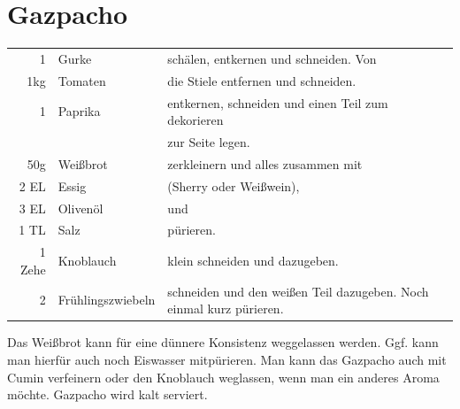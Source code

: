 \section{Gazpacho}
\begin{longtable}{rlL{16.46cm}}
    1       &   Gurke               &   schälen, entkernen und schneiden.
                                        Von\\
    1kg     &   Tomaten             &   die Stiele entfernen und schneiden.\\
    1       &   Paprika             &   entkernen, schneiden und einen Teil zum dekorieren\\
            &                       &   zur Seite legen.\\
    50g     &   Weißbrot            &   zerkleinern und alles zusammen mit\\
    2 EL    &   Essig               &   (Sherry oder Weißwein),\\
    3 EL    &   Olivenöl            &   und\\
    1 TL    &   Salz                &   pürieren.\\
    1 Zehe  &   Knoblauch           &   klein schneiden und dazugeben.\\
    2       &   Frühlingszwiebeln   &   schneiden und den weißen Teil dazugeben.
                                        Noch einmal kurz pürieren.\\
\end{longtable}
Das Weißbrot kann für eine dünnere Konsistenz weggelassen werden.
Ggf. kann man hierfür auch noch Eiswasser mitpürieren.
Man kann das Gazpacho auch mit Cumin verfeinern oder den Knoblauch weglassen, wenn man ein anderes Aroma möchte.
Gazpacho wird kalt serviert.
